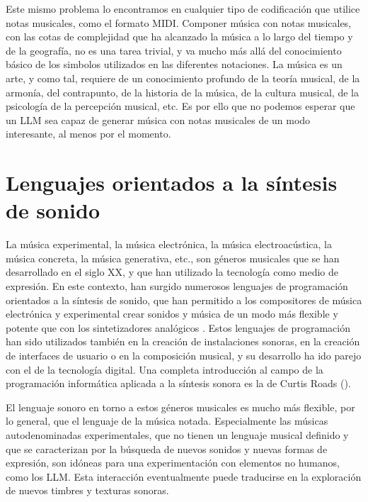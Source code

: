 Este mismo problema lo encontramos en cualquier tipo de codificación que utilice notas musicales, como el formato MIDI.
Componer música con notas musicales, con las cotas de complejidad que ha alcanzado la música a lo largo del tiempo y de la geografía, no es una tarea trivial, y va mucho más allá del conocimiento básico de los simbolos utilizados en las diferentes notaciones. La música es un arte, y como tal, requiere de un conocimiento profundo de la teoría musical, de la armonía, del contrapunto, de la historia de la música, de la cultura musical, de la psicología de la percepción musical, etc. Es por ello que no podemos esperar que un LLM sea capaz de generar música con notas musicales de un modo interesante, al menos por el momento.

\section{Lenguajes orientados a la síntesis de sonido}

La música experimental, la música electrónica, la música electroacústica, la música concreta, la música generativa, etc., son géneros musicales que se han desarrollado en el siglo XX, y que han utilizado la tecnología como medio de expresión. En este contexto, han surgido numerosos lenguajes de programación orientados a la síntesis de sonido, que han permitido a los compositores de música electrónica y experimental crear sonidos y música de un modo más flexible y potente que con los sintetizadores analógicos . Estos lenguajes de programación han sido utilizados también en la creación de instalaciones sonoras, en la creación de interfaces de usuario o en la composición musical, y su desarrollo ha ido parejo con el de la tecnología digital. Una completa introducción al campo de la programación informática aplicada a la síntesis sonora es la de Curtis Roads (\citeyear{roadsComputerMusicTutorial1996}).

El lenguaje sonoro en torno a estos géneros musicales es mucho más flexible, por lo general, que el lenguaje de la música notada. Especialmente las músicas autodenominadas experimentales, que no tienen un lenguaje musical definido y que se caracterizan por la búsqueda de nuevos sonidos y nuevas formas de expresión, son idóneas para una experimentación con elementos no humanos, como los LLM. Esta interacción eventualmente puede traducirse en la exploración de nuevos timbres y texturas sonoras.

